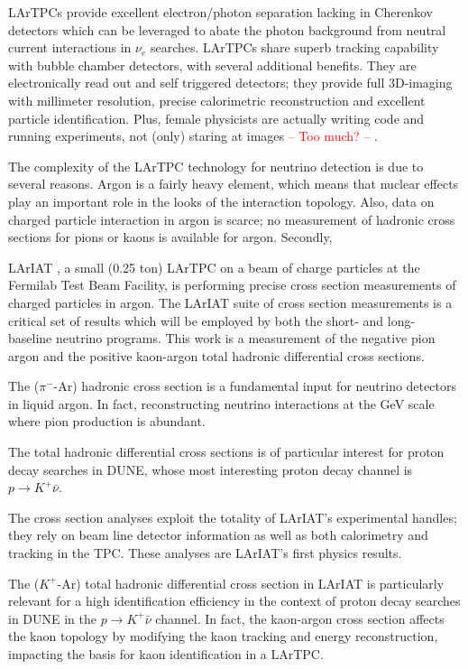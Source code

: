 LArTPCs provide excellent electron/photon separation \cite{Acciarri:2016sli} lacking in Cherenkov detectors which can be leveraged to abate the photon background from neutral current interactions  in $\nu_e$ searches. LArTPCs share superb tracking capability with bubble chamber detectors, with several additional benefits. They are electronically read out and self triggered detectors; they provide full 3D-imaging with millimeter resolution, precise calorimetric reconstruction and excellent particle identification. Plus, female physicists are actually writing code and running experiments, not (only) staring at images \textcolor{red}{-- Too much? --} \cite{2006physics4152G}. 

The complexity of the LArTPC technology for neutrino detection is due to several reasons. Argon is a fairly heavy element, which means that nuclear effects play an important role in the looks of the interaction topology. Also, data on charged particle interaction in argon is scarce;  no measurement of hadronic cross sections for pions or kaons is available for argon.
Secondly, 

LArIAT \cite{Cavanna:2014iqa}, a small (0.25 ton) LArTPC on a beam of charge particles at the Fermilab Test Beam Facility, is performing precise cross section measurements of charged particles in argon. The LArIAT suite of cross section measurements is a critical set of results which will be employed by both the short- and long- baseline neutrino programs. 
This work is a measurement of the negative pion argon and the positive kaon-argon total hadronic differential cross sections. 

The ($\pi^-$-Ar) hadronic cross section is a fundamental input for neutrino detectors in liquid argon. In fact, reconstructing neutrino interactions at the GeV scale where pion production is abundant. 

The   total hadronic differential cross sections is of particular interest for proton decay searches in DUNE, whose most interesting proton decay channel is $p\rightarrow K^+ \bar \nu$.   


The cross section analyses exploit the totality of LArIAT's experimental handles; they rely on beam line detector information as well as both calorimetry and tracking in the TPC. These analyses are LArIAT's first physics results. 

The  ($K^+$-Ar) total hadronic differential cross section in LArIAT is particularly relevant for a high identification efficiency in the context of proton decay searches in DUNE in the  $p\rightarrow K^+\bar{\nu}$  channel. In fact, the kaon-argon cross section affects the kaon topology by modifying the kaon tracking and energy reconstruction, impacting the basis for kaon identification in a LArTPC.  




